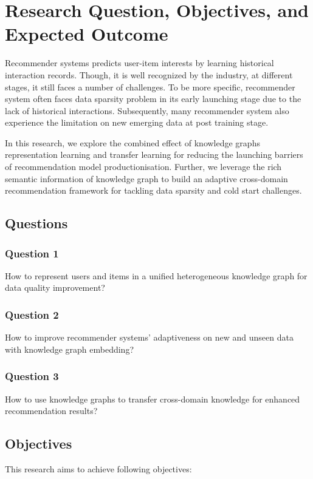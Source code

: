 
\section{Research Question, Objectives, and Expected Outcome}

Recommender systems predicts user-item interests by learning historical interaction records. Though, it is well recognized by the industry, at different stages, it still faces a number of challenges. 
To be more specific, recommender system often faces data sparsity problem in its early launching stage due to the lack of historical interactions. 
Subsequently, many recommender system also experience the limitation on new emerging data at post training stage. 

In this research, we explore the combined effect of knowledge graphs representation learning and transfer learning for reducing the launching barriers of recommendation model productionisation. Further, we leverage the rich semantic information of knowledge graph to build an adaptive cross-domain recommendation framework for tackling data sparsity and cold start challenges. 

\subsection{Questions}

\subsubsection*{Question 1}
How to represent users and items in a unified heterogeneous knowledge graph for data quality improvement?

\subsubsection*{Question 2}
How to improve recommender systems' adaptiveness on new and unseen data with knowledge graph embedding?

\subsubsection*{Question 3}
How to use knowledge graphs to transfer cross-domain knowledge for enhanced recommendation results?

\subsection{Objectives}
This research aims to achieve following objectives: 

